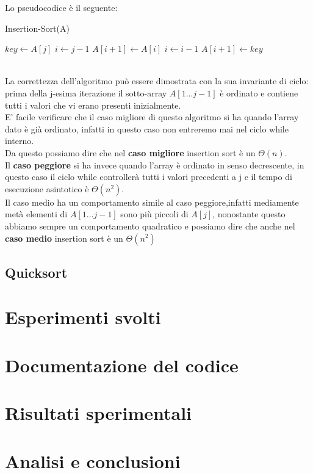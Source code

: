 \documentclass[]{article}
\begin{document}
Lo pseudocodice è il seguente:\\
\begin{algorithm}
\caption{Insertion-Sort(A)}
\begin{algorithmic}[1]
	\STATE $key \leftarrow A[j]$
	\STATE $i \leftarrow j - 1$
		\STATE	$A[i+1] \leftarrow A[i]$
		\STATE $ i \leftarrow i - 1$
	\ENDWHILE
	\STATE $ A[i+1] \leftarrow key$
\ENDFOR 
\end{algorithmic}
\end{algorithm}
\\
La correttezza dell'algoritmo può essere dimostrata con la sua invariante di ciclo:\\ prima della j-esima iterazione il sotto-array $A[1 ... j-1]$ è ordinato e contiene tutti i valori che vi erano presenti inizialmente.\\
E' facile verificare che il caso migliore di questo algoritmo si ha quando l'array dato è già ordinato, infatti in questo caso non entreremo mai nel ciclo while interno.\\
Da questo possiamo dire che nel \textbf{caso migliore} insertion sort è un $\Theta(n)$.\\
Il \textbf{caso peggiore} si ha invece quando l'array è ordinato in senso decrescente, in questo caso il ciclo while controllerà tutti i valori precedenti a j e il tempo di esecuzione asintotico è $\Theta(n^2)$.\\
Il caso medio ha un comportamento simile al caso peggiore,infatti mediamente metà elementi di $A[1 ... j-1]$ sono più piccoli di $A[j]$, nonostante questo abbiamo sempre un comportamento quadratico e possiamo dire che anche nel \textbf{caso medio} insertion sort è un $\Theta(n^2)$
\subsection{Quicksort}

\section{Esperimenti svolti}

\section{Documentazione del codice}

\section{Risultati sperimentali}

\section{Analisi e conclusioni}
\end{document}
